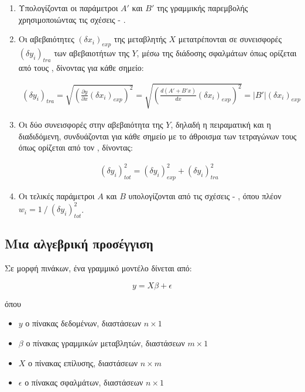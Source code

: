 \begin{refsection}
\begin{enumerate}

\item Υπολογίζονται οι παράμετροι $A'$ και $B'$ της γραμμικής παρεμβολής χρησιμοποιώντας τις σχέσεις  - .
\item Οι αβεβαιότητες $\left(\delta x_i \right)_{exp}$ της μεταβλητής $X$ μετατρέπονται σε συνεισφορές $\left(\delta y_i \right)_{tra}$ των αβεβαιοτήτων της $Y$, μέσω της διάδοσης σφαλμάτων όπως ορίζεται από τους \citeauthor{1953_Kline} \cite{1953_Kline}, δίνοντας για κάθε σημείο:

\begin{align*}
(\delta y_i)_{tra} = \sqrt{\left(\frac{\partial y}{\partial x} (\delta x_i)_{exp}\right)^2 } = \sqrt{\left(\frac{d (A' + B'x)}{d x} (\delta x_i)_{exp}\right)^2 } = |B'|\left(\delta x_i\right)_{exp}
\end{align*}

\item Οι δύο συνεισφορές στην αβεβαιότητα της $Y$, δηλαδή η πειραματική και η διαδιδόμενη, συνδυάζονται για κάθε σημείο με το άθροισμα των τετραγώνων τους όπως ορίζεται από τον \citeauthor{1988_Moffat} \cite{1988_Moffat}, δίνοντας:

\begin{align*}
(\delta y_i)_{tot}^2 = (\delta y_i)_{exp}^2 + (\delta y_i)_{tra}^2
\end{align*}

\item Οι τελικές παράμετροι $A$ και $B$ υπολογίζονται από τις σχέσεις  - , όπου πλέον $w_i = 1 \: / \: \left(\delta y_i\right)_{tot}^2$.

\end{enumerate}

\subsection*{Μια αλγεβρική προσέγγιση}

\noindent Σε μορφή πινάκων, ένα γραμμικό μοντέλο δίνεται από:

\begin{equation}\label{eqn:me}
y = X\beta + \epsilon
\end{equation}

\noindent όπου

\begin{itemize}
\item $y$ ο πίνακας δεδομένων, διαστάσεων $n \times 1$
\item $\beta$ ο πίνακας γραμμικών μεταβλητών, διαστάσεων $m \times 1$
\item $X$ ο πίνακας επίλυσης, διαστάσεων $n \times m$
\item $\epsilon$ ο πίνακας σφαλμάτων, διαστάσεων $n \times 1$
\end{itemize}


\end{refsection}
